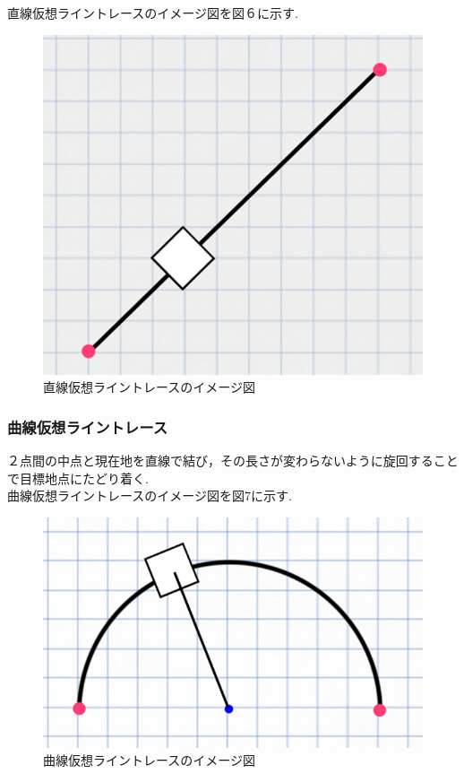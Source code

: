 \documentclass[submit,techrep,noauthor]{ipsj}
\begin{document}
直線仮想ライントレースのイメージ図を図６に示す.\\

\begin{figure}[h]
 \centering
   \includegraphics[scale=0.4]{LineTrace.png}
 \caption{直線仮想ライントレースのイメージ図}
 \label{直線仮想ライントレースのイメージ図}
\end{figure}


\subsubsection{曲線仮想ライントレース}
２点間の中点と現在地を直線で結び，その長さが変わらないように旋回することで目標地点にたどり着く.\\
曲線仮想ライントレースのイメージ図を図7に示す.\\
\begin{figure}[h]
 \centering
   \includegraphics[scale=0.48]{curveLineTrace.png}
 \caption{曲線仮想ライントレースのイメージ図}
 \label{曲線仮想ライントレースのイメージ図}
\end{figure}
\end{document}
